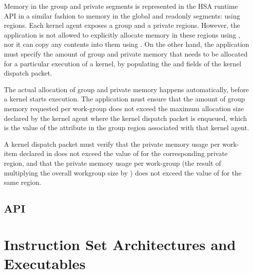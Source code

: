 \documentclass[oneside]{book}
\begin{document}
Memory in the group and private segments is represented in the HSA runtime API
in a similar fashion to memory in the global and readonly segments: using
regions. Each kernel agent exposes a group and a private regions. However, the
application is not allowed to explicitly allocate memory in these regions using
, nor it can copy any contents into them using
. On the other hand, the application must specify the
amount of group and private memory that needs to be allocated for a particular
execution of a kernel, by populating the
 and
 fields of the kernel
dispatch packet.

The actual allocation of group and private memory happens automatically, before
a kernel starts execution. The application must ensure that the amount of group
memory requested per work-group does not exceed the maximum allocation size
declared by the kernel agent where the kernel dispatch packet is enqueued, which
is the value of the  attribute in the
group region associated with that kernel agent.

A kernel dispatch packet must verify that the private memory usage per work-item
declared in  does not
exceed the value of  for the
corresponding private region, and that the private memory usage per work-group
(the result of multiplying the overall workgroup size by
) does not exceed the
value of  for the same
region.

\subsection{API}



\section{Instruction Set Architectures and Executables}\label{sec:codeobjects}

\end{document}
